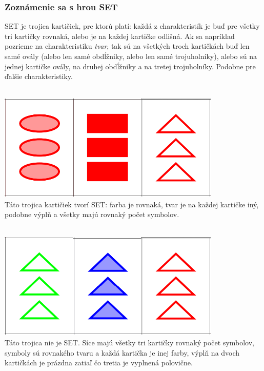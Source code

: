 \documentclass[11pt,a4paper,oneside,final]{book}
\begin{document}
\subsubsection*{Zoznámenie sa s hrou SET}
SET je trojica kartičiek, pre ktorú platí: každá z charakteristík je buď pre všetky tri kartičky rovnaká, alebo je na každej kartičke odlišná. Ak sa napríklad pozrieme na charakteristiku \textit{tvar}, tak sú na všetkých troch kartičkách buď len samé ovály (alebo len samé obdĺžniky, alebo len samé trojuholníky), alebo sú na jednej kartičke ovály, na druhej obdĺžniky a na tretej trojuholníky. Podobne pre ďalšie charakteristiky. \\
\\ \vspace{10pt}
\noindent
\begin{minipage}{.4\textwidth}
\includegraphics[width=0.8\textwidth]{set_ano}\\
Táto trojica kartičiek tvorí SET: farba je rovnaká, tvar je na každej kartičke iný, podobne výplň a všetky majú rovnaký počet symbolov. \\
\\

\end{minipage}%
\hspace{20pt}\begin{minipage}{.4\textwidth}
\includegraphics[width=0.8\textwidth]{set_nie}\\
Táto trojica nie je SET. Síce majú všetky tri kartičky rovnaký počet symbolov, symboly sú rovnakého tvaru a každá kartička je inej farby, výplň na dvoch kartičkách je prázdna zatiaľ čo tretia je vyplnená polovične.
\end{minipage}
\end{document}
